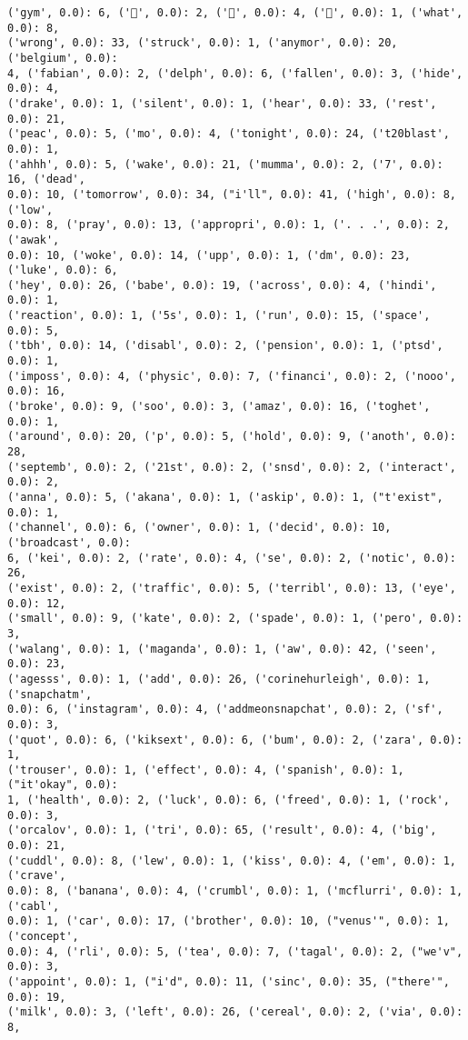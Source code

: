 \documentclass[11pt]{article}
\begin{document}
\begin{Verbatim}[commandchars=\\\{\}]
('gym', 0.0): 6, ('💪', 0.0): 2, ('🏻', 0.0): 4, ('🐒', 0.0): 1, ('what', 0.0): 8,
('wrong', 0.0): 33, ('struck', 0.0): 1, ('anymor', 0.0): 20, ('belgium', 0.0):
4, ('fabian', 0.0): 2, ('delph', 0.0): 6, ('fallen', 0.0): 3, ('hide', 0.0): 4,
('drake', 0.0): 1, ('silent', 0.0): 1, ('hear', 0.0): 33, ('rest', 0.0): 21,
('peac', 0.0): 5, ('mo', 0.0): 4, ('tonight', 0.0): 24, ('t20blast', 0.0): 1,
('ahhh', 0.0): 5, ('wake', 0.0): 21, ('mumma', 0.0): 2, ('7', 0.0): 16, ('dead',
0.0): 10, ('tomorrow', 0.0): 34, ("i'll", 0.0): 41, ('high', 0.0): 8, ('low',
0.0): 8, ('pray', 0.0): 13, ('appropri', 0.0): 1, ('. . .', 0.0): 2, ('awak',
0.0): 10, ('woke', 0.0): 14, ('upp', 0.0): 1, ('dm', 0.0): 23, ('luke', 0.0): 6,
('hey', 0.0): 26, ('babe', 0.0): 19, ('across', 0.0): 4, ('hindi', 0.0): 1,
('reaction', 0.0): 1, ('5s', 0.0): 1, ('run', 0.0): 15, ('space', 0.0): 5,
('tbh', 0.0): 14, ('disabl', 0.0): 2, ('pension', 0.0): 1, ('ptsd', 0.0): 1,
('imposs', 0.0): 4, ('physic', 0.0): 7, ('financi', 0.0): 2, ('nooo', 0.0): 16,
('broke', 0.0): 9, ('soo', 0.0): 3, ('amaz', 0.0): 16, ('toghet', 0.0): 1,
('around', 0.0): 20, ('p', 0.0): 5, ('hold', 0.0): 9, ('anoth', 0.0): 28,
('septemb', 0.0): 2, ('21st', 0.0): 2, ('snsd', 0.0): 2, ('interact', 0.0): 2,
('anna', 0.0): 5, ('akana', 0.0): 1, ('askip', 0.0): 1, ("t'exist", 0.0): 1,
('channel', 0.0): 6, ('owner', 0.0): 1, ('decid', 0.0): 10, ('broadcast', 0.0):
6, ('kei', 0.0): 2, ('rate', 0.0): 4, ('se', 0.0): 2, ('notic', 0.0): 26,
('exist', 0.0): 2, ('traffic', 0.0): 5, ('terribl', 0.0): 13, ('eye', 0.0): 12,
('small', 0.0): 9, ('kate', 0.0): 2, ('spade', 0.0): 1, ('pero', 0.0): 3,
('walang', 0.0): 1, ('maganda', 0.0): 1, ('aw', 0.0): 42, ('seen', 0.0): 23,
('agesss', 0.0): 1, ('add', 0.0): 26, ('corinehurleigh', 0.0): 1, ('snapchatm',
0.0): 6, ('instagram', 0.0): 4, ('addmeonsnapchat', 0.0): 2, ('sf', 0.0): 3,
('quot', 0.0): 6, ('kiksext', 0.0): 6, ('bum', 0.0): 2, ('zara', 0.0): 1,
('trouser', 0.0): 1, ('effect', 0.0): 4, ('spanish', 0.0): 1, ("it'okay", 0.0):
1, ('health', 0.0): 2, ('luck', 0.0): 6, ('freed', 0.0): 1, ('rock', 0.0): 3,
('orcalov', 0.0): 1, ('tri', 0.0): 65, ('result', 0.0): 4, ('big', 0.0): 21,
('cuddl', 0.0): 8, ('lew', 0.0): 1, ('kiss', 0.0): 4, ('em', 0.0): 1, ('crave',
0.0): 8, ('banana', 0.0): 4, ('crumbl', 0.0): 1, ('mcflurri', 0.0): 1, ('cabl',
0.0): 1, ('car', 0.0): 17, ('brother', 0.0): 10, ("venus'", 0.0): 1, ('concept',
0.0): 4, ('rli', 0.0): 5, ('tea', 0.0): 7, ('tagal', 0.0): 2, ("we'v", 0.0): 3,
('appoint', 0.0): 1, ("i'd", 0.0): 11, ('sinc', 0.0): 35, ("there'", 0.0): 19,
('milk', 0.0): 3, ('left', 0.0): 26, ('cereal', 0.0): 2, ('via', 0.0): 8,

\end{Verbatim}
\end{document}
